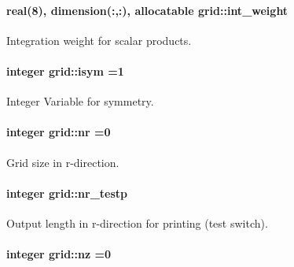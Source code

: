\paragraph[{\texorpdfstring{int\+\_\+weight}{int_weight}}]{\setlength{\rightskip}{0pt plus 5cm}real(8), dimension(\+:,\+:), allocatable grid\+::int\+\_\+weight}\hypertarget{namespacegrid_a77471665506f557a1b28abdc12d6a60a}{}\label{namespacegrid_a77471665506f557a1b28abdc12d6a60a}


Integration weight for scalar products. 

\paragraph[{\texorpdfstring{isym}{isym}}]{\setlength{\rightskip}{0pt plus 5cm}integer grid\+::isym =1}\hypertarget{namespacegrid_a2aa66619046d86914292b3e3826e6149}{}\label{namespacegrid_a2aa66619046d86914292b3e3826e6149}


Integer Variable for symmetry. 

\paragraph[{\texorpdfstring{nr}{nr}}]{\setlength{\rightskip}{0pt plus 5cm}integer grid\+::nr =0}\hypertarget{namespacegrid_adcf6fea7f9e201561e68a1d7c04421c5}{}\label{namespacegrid_adcf6fea7f9e201561e68a1d7c04421c5}


Grid size in r-\/direction. 

\paragraph[{\texorpdfstring{nr\+\_\+testp}{nr_testp}}]{\setlength{\rightskip}{0pt plus 5cm}integer grid\+::nr\+\_\+testp}\hypertarget{namespacegrid_af1ff96c4459cb5671a60fe70e6ce6a3e}{}\label{namespacegrid_af1ff96c4459cb5671a60fe70e6ce6a3e}


Output length in r-\/direction for printing (test switch). 

\paragraph[{\texorpdfstring{nz}{nz}}]{\setlength{\rightskip}{0pt plus 5cm}integer grid\+::nz =0}\hypertarget{namespacegrid_ac1e240a950d37771ad366b8b12b3743e}{}\label{namespacegrid_ac1e240a950d37771ad366b8b12b3743e}


